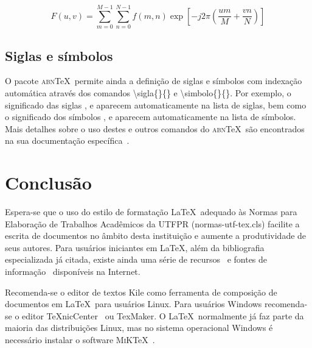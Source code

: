 \documentclass[openright]{normas-utf-tex} %
\begin{document}
\begin{equation}
F(u, v) = \sum_{m = 0}^{M - 1} \sum_{n = 0}^{N - 1} f(m, n) \exp \left[ -j 2 \pi \left( \frac{u m}{M} + \frac{v n}{N} \right) \right]
\label{eq:dft}
\end{equation}

\section{Siglas e símbolos}
\label{sec:siglasSimbolos}

O pacote \textsc{abn}\TeX\ permite ainda a definição de siglas e símbolos com indexação automática através dos comandos {\ttfamily \textbackslash sigla\{\}\{\}} e {\ttfamily \textbackslash simbolo\{\}\{\}}. Por exemplo, o significado das siglas ,  e  aparecem automaticamente na lista de siglas, bem como o significado dos símbolos ,  e  aparecem automaticamente na lista de símbolos. Mais detalhes sobre o uso destes e outros comandos do \textsc{abn}\TeX\ são encontrados na sua documentação específica~\cite{abnTeX2009}.


\chapter{Conclusão}
\label{chap:conclusao}

Espera-se que o uso do estilo de formatação \LaTeX\ adequado às Normas para Elaboração de Trabalhos Acadêmicos da UTFPR ({\ttfamily normas-utf-tex.cls}) facilite a escrita de documentos no âmbito desta instituição e aumente a produtividade de seus autores. Para usuários iniciantes em \LaTeX, além da bibliografia especializada já citada, existe ainda uma série de recursos~\cite{CTAN2009} e fontes de informação~\cite{TeX-Br2009,Wikibooks2009} disponíveis na Internet.

Recomenda-se o editor de textos Kile como ferramenta de composição de documentos em \LaTeX\ para usuários Linux. Para usuários Windows recomenda-se o editor \TeX nicCenter~\cite{TeXnicCenter2009} ou TexMaker. O \LaTeX\ normalmente já faz parte da maioria das distribuições Linux, mas no sistema operacional Windows é necessário instalar o software \textsc{MiK}\TeX~\cite{MiKTeX2009}.
\end{document}
